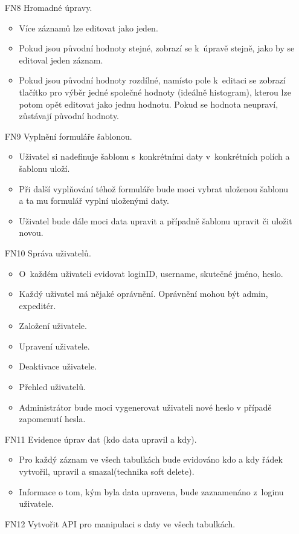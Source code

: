\documentclass[thesis=B,czech]{FITthesis}[2012/06/26]
\begin{document}
\begin{enumerate}
	\item[FN8] Hromadné úpravy.
	\begin{itemize}
		\item Více záznamů lze editovat jako jeden. 
		\item Pokud jsou původní hodnoty stejné, zobrazí se k~úpravě stejně, jako by se editoval jeden záznam. 
		\item Pokud jsou původní hodnoty rozdílné, namísto pole k~editaci se zobrazí tlačítko pro výběr jedné společné hodnoty (ideálně histogram), kterou lze potom opět editovat jako jednu hodnotu. Pokud se hodnota neupraví, zůstávají původní hodnoty.
	\end{itemize}
	\item[FN9] Vyplnění formuláře šablonou.
	\begin{itemize}
		\item Uživatel si nadefinuje šablonu s~konkrétními daty v~konkrétních polích a šablonu uloží. 
		\item Při další vyplňování téhož formuláře bude moci vybrat uloženou šablonu a ta mu formulář vyplní uloženými daty. 
		\item Uživatel bude dále moci data upravit a případně šablonu upravit či uložit novou.
	\end{itemize}
	\item[FN10] Správa uživatelů.
	\begin{itemize}
		\item O~každém uživateli evidovat loginID, username, skutečné jméno, heslo.
		\item Každý uživatel má nějaké oprávnění. Oprávnění mohou být admin, expeditér.
		\item Založení uživatele.
		\item Upravení uživatele.
		\item Deaktivace uživatele.
		\item Přehled uživatelů.
		\item Administrátor bude moci vygenerovat uživateli nové heslo v případě zapomenutí hesla.
	\end{itemize}
	\item[FN11] Evidence úprav dat (kdo data upravil a kdy).
	\begin{itemize}
		\item Pro každý záznam ve všech tabulkách bude evidováno kdo a kdy řádek vytvořil, upravil a smazal(technika soft delete).
		\item Informace o tom, kým byla data upravena, bude zaznamenáno z~loginu uživatele.	
	\end{itemize}
	\item[FN12] Vytvořit API pro manipulaci s daty ve všech tabulkách.
\end{enumerate}
\end{document}
